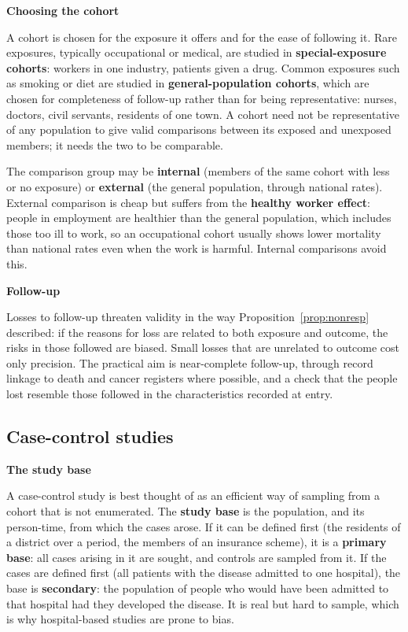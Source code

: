 \documentclass[11pt,a4paper]{article}
\numberwithin{equation}{section}
\theoremstyle{definition}
\newcommand{\subhead}[1]{%
  \par\medskip\noindent\textbf{#1}\par\nobreak\smallskip}
\begin{document}
\subhead{Choosing the cohort}

A cohort is chosen for the exposure it offers and for the ease of following it. Rare exposures, typically occupational or medical, are
studied in \textbf{special-exposure cohorts}: workers in one industry, patients given a drug. Common exposures such as smoking or diet
are studied in \textbf{general-population cohorts}, which are chosen for completeness of follow-up rather than for being representative: nurses,
doctors, civil servants, residents of one town. A cohort need not be representative of any population to give valid comparisons between
its exposed and unexposed members; it needs the two to be comparable.

The comparison group may be \textbf{internal} (members of the same cohort with less or no exposure) or \textbf{external} (the general
population, through national rates). External comparison is cheap but suffers from the \textbf{healthy worker effect}: people in
employment are healthier than the general population, which includes those too ill to work, so an occupational cohort usually shows
lower mortality than national rates even when the work is harmful. Internal comparisons avoid this.

\subhead{Follow-up}

Losses to follow-up threaten validity in the way Proposition~\ref{prop:nonresp} described: if the reasons for loss are related to both
exposure and outcome, the risks in those followed are biased. Small losses that are unrelated to outcome cost only precision. The
practical aim is near-complete follow-up, through record linkage to death and cancer registers where possible, and a check that the
people lost resemble those followed in the characteristics recorded at entry.

\subsection{Case-control studies}

\subhead{The study base}

A case-control study is best thought of as an efficient way of sampling from a cohort that is not enumerated. The \textbf{study base} is
the population, and its person-time, from which the cases arose. If it can be defined first (the residents of a district over a period,
the members of an insurance scheme), it is a \textbf{primary base}: all cases arising in it are sought, and controls are sampled from
it. If the cases are defined first (all patients with the disease admitted to one hospital), the base is \textbf{secondary}: the
population of people who would have been admitted to that hospital had they developed the disease. It is real but hard to sample,
which is why hospital-based studies are prone to bias.
\end{document}
